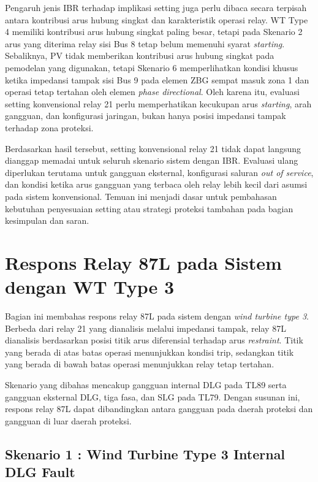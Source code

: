 Pengaruh jenis IBR terhadap implikasi setting juga perlu dibaca secara terpisah antara kontribusi arus hubung singkat dan karakteristik operasi relay. WT Type 4 memiliki kontribusi arus hubung singkat paling besar, tetapi pada Skenario 2 arus yang diterima relay sisi Bus 8 tetap belum memenuhi syarat \textit{starting}. Sebaliknya, PV tidak memberikan kontribusi arus hubung singkat pada pemodelan yang digunakan, tetapi Skenario 6 memperlihatkan kondisi khusus ketika impedansi tampak sisi Bus 9 pada elemen ZBG sempat masuk zona 1 dan operasi tetap tertahan oleh elemen \textit{phase directional}. Oleh karena itu, evaluasi setting konvensional relay 21 perlu memperhatikan kecukupan arus \textit{starting}, arah gangguan, dan konfigurasi jaringan, bukan hanya posisi impedansi tampak terhadap zona proteksi.

Berdasarkan hasil tersebut, setting konvensional relay 21 tidak dapat langsung dianggap memadai untuk seluruh skenario sistem dengan IBR. Evaluasi ulang diperlukan terutama untuk gangguan eksternal, konfigurasi saluran \textit{out of service}, dan kondisi ketika arus gangguan yang terbaca oleh relay lebih kecil dari asumsi pada sistem konvensional. Temuan ini menjadi dasar untuk pembahasan kebutuhan penyesuaian setting atau strategi proteksi tambahan pada bagian kesimpulan dan saran.

\section{Respons Relay 87L pada Sistem dengan WT Type 3}

Bagian ini membahas respons relay 87L pada sistem dengan \textit{wind turbine type 3}. Berbeda dari relay 21 yang dianalisis melalui impedansi tampak, relay 87L dianalisis berdasarkan posisi titik arus diferensial terhadap arus \textit{restraint}. Titik yang berada di atas batas operasi menunjukkan kondisi trip, sedangkan titik yang berada di bawah batas operasi menunjukkan relay tetap tertahan.

Skenario yang dibahas mencakup gangguan internal DLG pada TL89 serta gangguan eksternal DLG, tiga fasa, dan SLG pada TL79. Dengan susunan ini, respons relay 87L dapat dibandingkan antara gangguan pada daerah proteksi dan gangguan di luar daerah proteksi.

\subsection{Skenario 1 : Wind Turbine Type 3 Internal DLG Fault}

